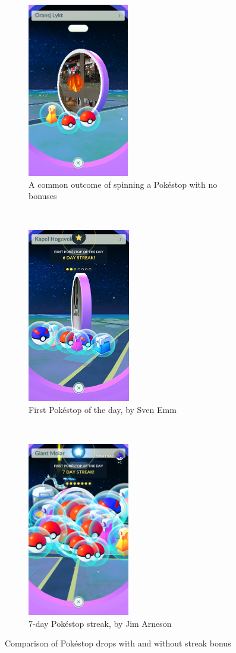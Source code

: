\begin{figure}[h]
	\centering
	\begin{subfigure}[t]{0.3\textwidth}
		\centering
		\includegraphics[height=3in]{Figures/pogo-regular-pokestop}
		\caption{A common outcome of spinning a Pokéstop with no bonuses}
	\end{subfigure}
	~
	\begin{subfigure}[t]{0.3\textwidth}
		\centering
		\includegraphics[height=3in]{Figures/pogo-daily-pokestop}
		\caption{First Pokéstop of the day, by Sven Emm}
	\end{subfigure}
	~
	\begin{subfigure}[t]{0.3\textwidth}
		\centering
		\includegraphics[height=3in]{Figures/pogo-7-day-pokestop-jim_arneson}
		\caption{7-day Pokéstop streak, by Jim Arneson}
	\end{subfigure}
	\caption{Comparison of Pokéstop drops with and without streak bonus}
\end{figure}

